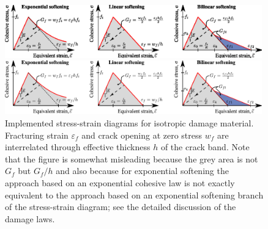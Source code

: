 \documentclass[a4paper]{article}
\begin{document}
\begin{figure}[!htb]
\begin{htmlonly}
  \centerline{\includegraphics[width=0.99\textwidth]{Damage_material_diag.eps}}
\end{htmlonly}
 \centerline{\includegraphics[width=0.99\textwidth]{Damage_material_diag}}
  \caption{Implemented stress-strain diagrams for isotropic damage material. Fracturing strain $\varepsilon_f$ and crack opening at zero stress $w_f$ are interrelated through effective thickness $h$ of the crack band. Note that the
figure is somewhat misleading because the grey area is not $G_f$ but $G_f/h$ 
and also because for exponential softening the approach based on an exponential cohesive law is not exactly equivalent to the approach based on an exponential softening branch of the stress-strain diagram; see the detailed discussion of the damage laws.}
  \label{idm_softening}
\end{figure}
\end{document}
